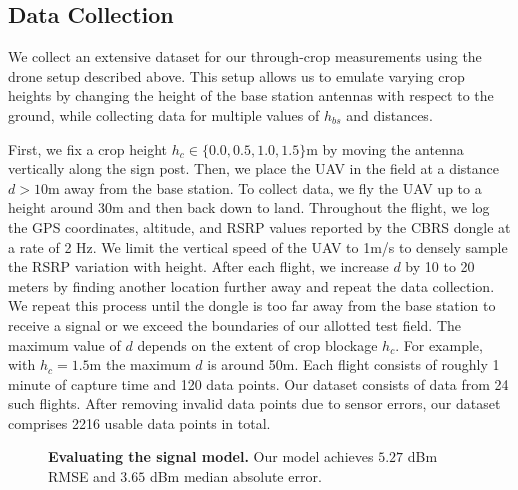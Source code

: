 \subsection{Data Collection}\label{sec:dataset}

We collect an extensive dataset for our through-crop measurements using the drone setup described above. This setup allows us to emulate varying crop heights by changing the height of the base station antennas with respect to the ground, while collecting data for multiple values of $h_{bs}$ and distances. 

First, we fix a crop height $h_c \in \{0.0, 0.5, 1.0, 1.5\}$m by moving the antenna vertically along the sign post. Then, we place the UAV in the field at a distance $d > 10$m away from the base station. To collect data, we fly the UAV up to a height around 30m and then back down to land. Throughout the flight, we log the GPS coordinates, altitude, and RSRP values reported by the CBRS dongle at a rate of 2 Hz. We limit the vertical speed of the UAV to 1m/s to densely sample the RSRP variation with height. After each flight, we increase $d$ by 10 to 20 meters by finding another location further away and repeat the data collection. We repeat this process until the dongle is too far away from the base station to receive a signal or we exceed the boundaries of our allotted test field. The maximum value of $d$ depends on the extent of crop blockage $h_c$. For example, with $h_c=1.5$m the maximum $d$ is around 50m. Each flight consists of roughly 1 minute of capture time and 120 data points. Our dataset consists of data from 24 such flights. After removing invalid data points due to sensor errors, our dataset comprises 2216 usable data points in total.
\begin{figure*}
     \hfill
     \hfill
    \vspace{-0.2in}
    \caption{\textbf{Evaluating the signal model.} Our model achieves $5.27$ dBm RMSE and $3.65$ dBm median absolute error. }
    \label{fig:signal_model_eval}
    \vspace{-0.2in}
\end{figure*}

